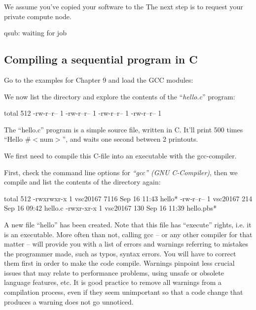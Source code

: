 We assume you've copied your software to the \hpc The next step is to request your private compute node.
\begin{prompt}
qsub: waiting for job %
\end{prompt}

\subsection{Compiling a sequential program in C}

Go to the examples for Chapter 9 and load the GCC modules:
\begin{prompt}
\end{prompt}

We now list the directory and explore the contents of the ``\emph{hello.c}''
program:

\begin{prompt}
total 512
-rw-r--r-- 1 %
-rw-r--r-- 1 %
-rw-r--r-- 1 %
-rw-r--r-- 1 %
\end{prompt}


The ``hello.c'' program is a simple source file, written in C. It'll print 500
times ``Hello \#$<$num$>$'', and waits one second between 2 printouts.

We first need to compile this C-file into an executable with the gcc-compiler.

First, check the command line options for \emph{``gcc'' (GNU C-Compiler)},
then we compile and list the contents of the directory again:

\begin{prompt}
total 512
-rwxrwxr-x 1 vsc20167 7116 Sep 16 11:43 hello*
-rw-r--r-- 1 vsc20167  214 Sep 16 09:42 hello.c
-rwxr-xr-x 1 vsc20167  130 Sep 16 11:39 hello.pbs*
\end{prompt}

A new file ``hello'' has been created. Note that this file has ``execute''
rights, i.e. it is an executable. More often than not, calling gcc -- or any
other compiler for that matter -- will provide you with a list of errors and
warnings referring to mistakes the programmer made, such as typos, syntax
errors. You will have to correct them first in order to make the code compile.
Warnings pinpoint less crucial issues that may relate to performance problems,
using unsafe or obsolete language features, etc. It is good practice to remove
all warnings from a compilation process, even if they seem unimportant so that
a code change that produces a warning does not go unnoticed.

